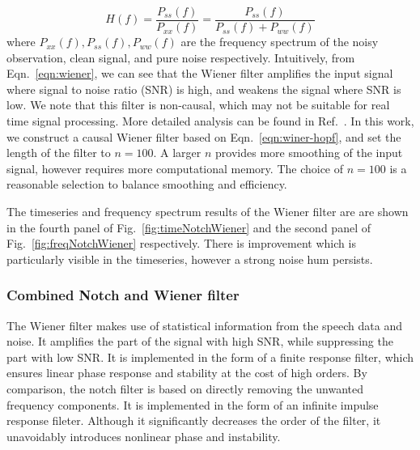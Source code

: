 \documentclass[paper-main.tex]{subfiles}
\begin{document}
\begin{equation}
\label{eqn:wiener}
    H(f)=\frac{P_{ss}(f)}{P_{xx}(f)}=\frac{P_{ss}(f)}{P_{ss}(f)+P_{ww}(f)}
\end{equation}
where $P_{xx}(f),P_{ss}(f),P_{ww}(f)$ are the frequency spectrum of the noisy observation, clean signal, and pure noise respectively. 
Intuitively, from Eqn.~\ref{eqn:wiener}, we can see that the Wiener filter amplifies the input signal where signal to noise ratio (SNR) is high, and weakens the signal where SNR is low.
We note that this filter is non-causal, which may not be suitable for real time signal processing. 
More detailed analysis can be found in Ref.~\citep{10.5555/151045}. 
In this work, we construct a causal Wiener filter based on Eqn.~\ref{eqn:winer-hopf}, and set the length of the filter to $n=100$. 
A larger $n$ provides more smoothing of the input signal, however requires more computational memory. 
The choice of $n=100$ is a reasonable selection to balance smoothing and efficiency. 

The timeseries and frequency spectrum results of the Wiener filter are are shown in the fourth panel of Fig.~\ref{fig:timeNotchWiener} and the second panel of Fig.~\ref{fig:freqNotchWiener} respectively. 
There is improvement which is particularly visible in the timeseries, however a strong noise hum persists. 


\subsubsection{Combined Notch and Wiener filter}
The Wiener filter makes use of statistical information from the speech data and noise. 
It amplifies the part of the signal with high SNR, while suppressing the part with low SNR. 
It is implemented in the form of a finite response filter, which ensures linear phase response and stability at the cost of high orders. 
By comparison, the notch filter is based on directly removing the unwanted frequency components. 
It is implemented in the form of an infinite impulse response fileter. 
Although it significantly decreases the order of the filter, it unavoidably introduces nonlinear phase and instability. 
\end{document}
